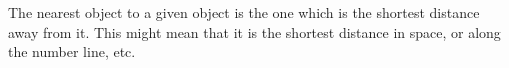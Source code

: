 The nearest object to a given object is the one which is the shortest 
distance away from it. This might mean that it is the shortest distance
in space, or along the number line, etc.